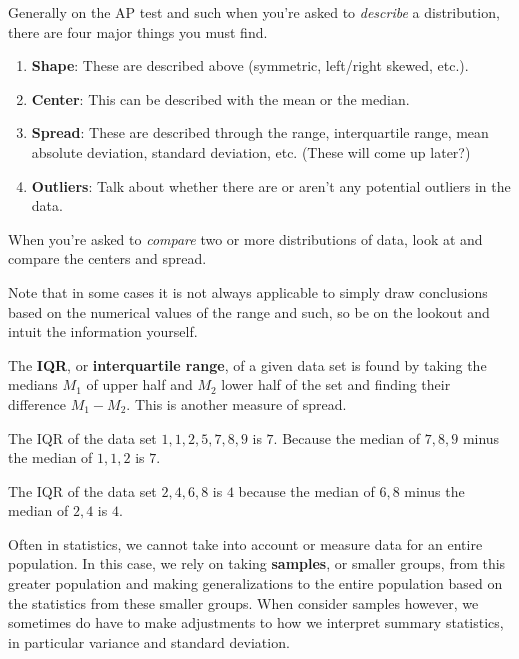 Generally on the AP test and such when you're asked to \textit{describe} a
distribution, there are four major things you must find.

\begin{enumerate}
    \item \textbf{Shape}: These are described above (symmetric, left/right skewed, etc.).
    \item \textbf{Center}: This can be described with the mean or the median.
    \item \textbf{Spread}: These are described through the range, interquartile range, mean absolute deviation, standard deviation, etc. (These will come up later?)
    \item \textbf{Outliers}: Talk about whether there are or aren't any potential outliers in the data.
\end{enumerate}

When you're asked to \textit{compare} two or more distributions of data, look
at and compare the centers and spread.

Note that in some cases it is not always applicable to simply draw conclusions
based on the numerical values of the range and such, so be on the lookout and
intuit the information yourself.

\begin{blackbox}
    \begin{definition}
        The \textbf{IQR}, or \textbf{interquartile range}, of a given data set
        is found by taking the medians \( M_1 \) of upper half and \( M_2 \)
        lower half of the set and finding their difference \( M_1 - M_2 \).
        This is another measure of spread.
    \end{definition}
\end{blackbox}

\begin{example}
    The IQR of the data set \( 1, 1, 2, 5, 7, 8, 9 \) is \( 7 \). Because the
    median of \( 7, 8, 9 \) minus the median of \( 1, 1, 2 \) is \( 7 \).

    The IQR of the data set \( 2, 4, 6, 8 \) is \( 4 \) because the median of \( 6, 8 \) minus the median of \( 2, 4 \) is \( 4 \).
\end{example}

Often in statistics, we cannot take into account or measure data for an entire
population. In this case, we rely on taking \textbf{samples}, or smaller
groups, from this greater population and making generalizations to the entire
population based on the statistics from these smaller groups. When consider
samples however, we sometimes do have to make adjustments to how we interpret
summary statistics, in particular variance and standard deviation.

